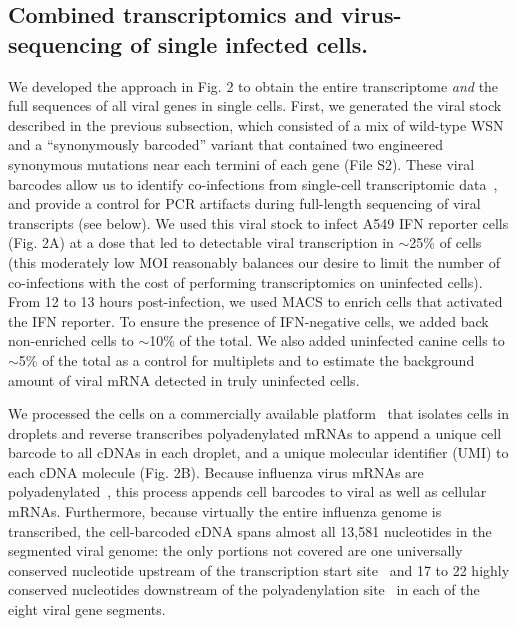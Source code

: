 \documentclass[]{article}
\begin{document}
\subsection*{Combined transcriptomics and virus-sequencing of single infected cells.}

We developed the approach in Fig. 2 to obtain the entire transcriptome \emph{and} the full sequences of all viral genes in single cells.
First, we generated the viral stock described in the previous subsection, which consisted of a mix of wild-type WSN and a ``synonymously barcoded'' variant that contained two engineered synonymous mutations near each termini of each gene (File S2).
These viral barcodes allow us to identify co-infections from single-cell transcriptomic data~\cite{russell2018extreme}, and provide a control for PCR artifacts during full-length sequencing of viral transcripts (see below).
We used this viral stock to infect A549 IFN reporter cells (Fig. 2A) at a dose that led to detectable viral transcription in $\sim$25\% of cells (this moderately low MOI reasonably balances our desire to limit the number of co-infections with the cost of performing transcriptomics on uninfected cells).
From 12 to 13 hours post-infection, we used MACS to enrich cells that activated the IFN reporter.
To ensure the presence of IFN-negative cells, we added back non-enriched cells to $\sim$10\% of the total.
We also added uninfected canine cells to $\sim$5\% of the total as a control for multiplets and to estimate the background amount of viral mRNA detected in truly uninfected cells.

We processed the cells on a commercially available platform~\cite{zheng2017massively} that isolates cells in droplets and reverse transcribes polyadenylated mRNAs to append a unique cell barcode to all cDNAs in each droplet, and a unique molecular identifier (UMI) to each cDNA molecule (Fig. 2B).
Because influenza virus mRNAs are polyadenylated~\cite{robertson1981polyadenylation}, this process appends cell barcodes to viral as well as cellular mRNAs.
Furthermore, because virtually the entire influenza genome is transcribed, the cell-barcoded cDNA spans almost all 13,581 nucleotides in the segmented viral genome: the only portions not covered are one universally conserved nucleotide upstream of the transcription start site~\cite{koppstein2015sequencing} and 17 to 22 highly conserved nucleotides downstream of the polyadenylation site~\cite{robertson1981polyadenylation} in each of the eight viral gene segments.
\end{document}
